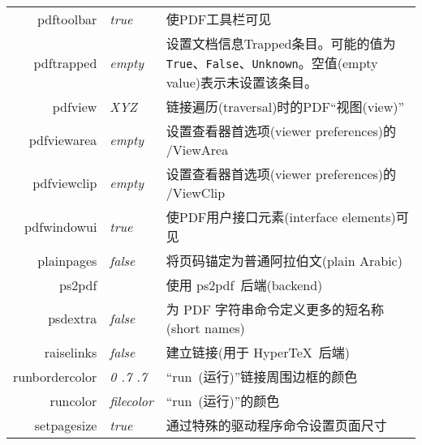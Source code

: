 \documentclass{article}
\begin{document}
\begin{longtable}{@{}>{\ttfamily}rlp{7cm}@{}}
    pdftoolbar                        & \textit{true}          & 使PDF工具栏可见                                                                                       \\
    pdftrapped                        & \textit{empty}         & 设置文档信息Trapped条目。可能的值为 \texttt{True}、\texttt{False}、\texttt{Unknown}。空值(empty value)表示未设置该条目。    \\
    pdfview                           & \textit{XYZ}           & 链接遍历(traversal)时的PDF“视图(view)”                                                                  \\
    pdfviewarea                       & \textit{empty}         & 设置查看器首选项(viewer preferences)的 /ViewArea                                                         \\
    pdfviewclip                       & \textit{empty}         & 设置查看器首选项(viewer preferences)的 /ViewClip                                                         \\
    pdfwindowui                       & \textit{true}          & 使PDF用户接口元素(interface elements)可见                                                                \\
    plainpages                        & \textit{false}         & 将页码锚定为普通阿拉伯文(plain Arabic)                                                                      \\
    ps2pdf                            &                        & 使用 \textsf{ps2pdf}\ 后端(backend)                                                                 \\
    psdextra                          & \textit{false}         & 为 PDF 字符串命令定义更多的短名称(short names)                                                                \\
    raiselinks                        & \textit{false}         & 建立链接(用于 \textsf{Hyper\TeX}\ 后端)                                                                 \\
    runbordercolor                    & \textit{0 .7 .7}       & “run~(运行)”链接周围边框的颜色                                                                             \\
    runcolor                          & \textit{filecolor}     & “run~(运行)”的颜色                                                                                   \\
    setpagesize                       & \textit{true}          & 通过特殊的驱动程序命令设置页面尺寸                                                                               \\

\end{longtable}
\end{document}
